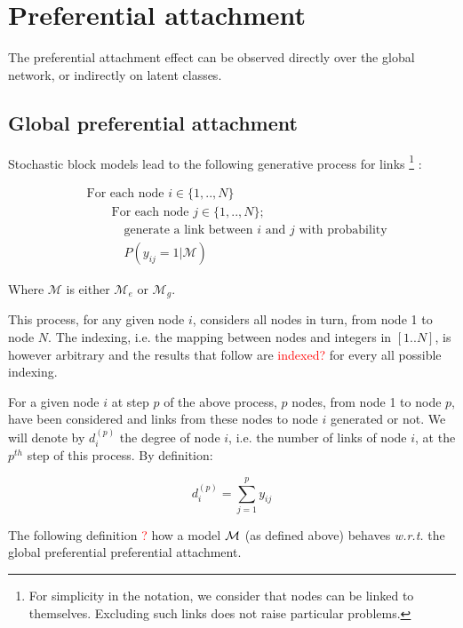 \section{Preferential attachment}
\label{sec:burstiness}

The preferential attachment effect can be observed directly over the global network, or indirectly on latent classes.

\subsection{Global preferential attachment}

Stochastic block models lead to the following generative process for links \footnote{For simplicity in the notation, we consider that nodes can be linked to themselves. Excluding such links does not raise particular problems.} :

\begin{align*}
    &\textrm{For each node } i \in \{1, .., N\}  \\
    &\qquad\textrm{For each node } j \in \{1, .., N\}; \\
    &\quad \qquad\textrm{generate a link between } i \textrm{ and } j \textrm{ with probability} \\
    &\quad \qquad P(y_{ij}=1 | \mathcal{M})
\end{align*}

Where $\mathcal{M}$ is either $\mathcal{M}_e$ or $\mathcal{M}_g$.

This process, for any given node $i$, considers all nodes in turn, from node 1 to node $N$. The indexing, i.e. the mapping between nodes and integers in $[1..N]$, is however arbitrary and the results that follow are \textcolor{red}{indexed?} for every all possible indexing.

For a given node $i$ at step $p$ of the above process, $p$ nodes, from node 1 to node $p$, have been considered and links from these nodes to node $i$ generated or not. We will denote by $d_i^{(p)}$ the degree of node $i$, i.e. the number of links of node $i$, at the $p^{th}$ step of this process. By definition:

\begin{equation} \label{eq:degree_def}
d_i^{(p)} = \sum_{j=1}^p y_{ij}
\end{equation}

The following definition \textcolor{red}{?} how a model $\mathcal{M}$ (as defined above) behaves \textit{w.r.t.} the global preferential preferential attachment.

